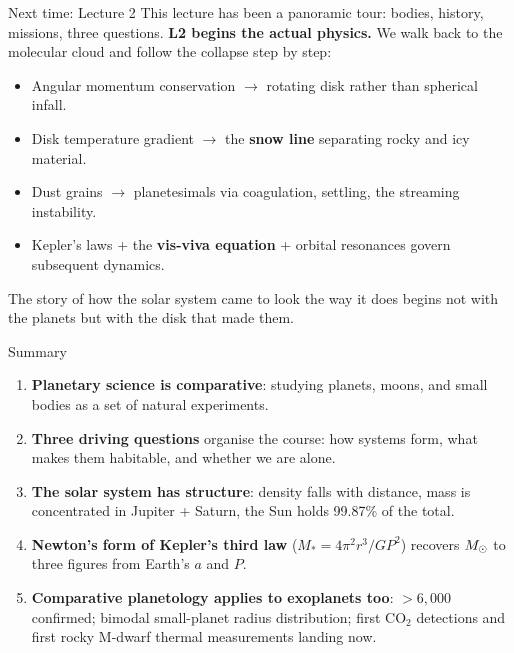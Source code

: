\documentclass[aspectratio=169, 11pt]{beamer}
\begin{document}
\begin{frame}{Next time: Lecture 2}
  This lecture has been a panoramic tour: bodies, history, missions, three questions.
  \vskip6pt\relax
  \textbf{L2 begins the actual physics.} We walk back to the molecular cloud and follow the collapse step by step:
  \begin{itemize}
    \item Angular momentum conservation $\to$ rotating disk rather than spherical infall.
    \item Disk temperature gradient $\to$ the \textbf{snow line} separating rocky and icy material.
    \item Dust grains $\to$ planetesimals via coagulation, settling, the streaming instability.
    \item Kepler's laws + the \textbf{vis-viva equation} + orbital resonances govern subsequent dynamics.
  \end{itemize}
  \vskip4pt\relax
  The story of how the solar system came to look the way it does begins not with the planets but with the disk that made them.
\end{frame}

\begin{frame}{Summary}
  \begin{enumerate}
    \item \textbf{Planetary science is comparative}: studying planets, moons, and small bodies as a set of natural experiments.
    \item \textbf{Three driving questions} organise the course: how systems form, what makes them habitable, and whether we are alone.
    \item \textbf{The solar system has structure}: density falls with distance, mass is concentrated in Jupiter + Saturn, the Sun holds 99.87\% of the total.
    \item \textbf{Newton's form of Kepler's third law} ($M_* = 4\pi^2 r^3 / G P^2$) recovers $M_{\odot}$ to three figures from Earth's $a$ and $P$.
    \item \textbf{Comparative planetology applies to exoplanets too}: $> 6{,}000$ confirmed; bimodal small-planet radius distribution; first $\mathrm{CO_2}$ detections and first rocky M-dwarf thermal measurements landing now.
  \end{enumerate}
\end{frame}
\end{document}
